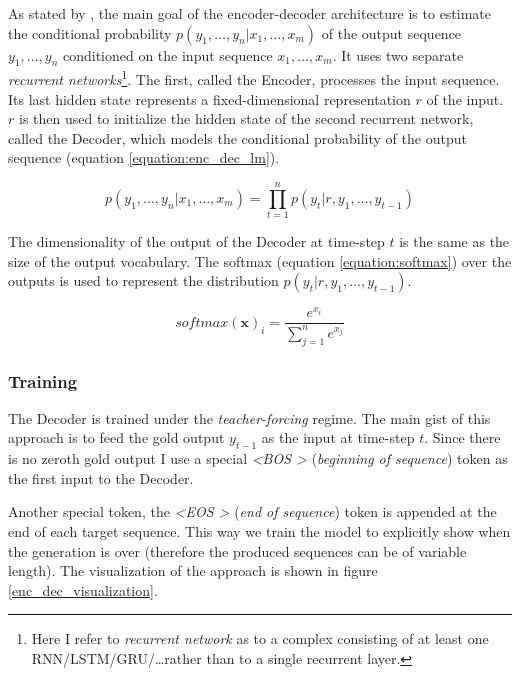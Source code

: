 As stated by \citep{sutskever2014sequence}, the main goal of the encoder-decoder architecture is to estimate the conditional probability $p(y_1,\dots,y_n | x_1,\dots,x_m)$ of the output sequence $y_1,\dots,y_n$ conditioned on the input sequence $x_1,\dots,x_m$. It uses two separate \emph{recurrent networks}\footnote{Here I refer to \emph{recurrent network} as to a complex consisting of at least one RNN/LSTM/GRU/\dots rather than to a single recurrent layer.}. The first, called the Encoder, processes the input sequence. Its last hidden state represents a fixed-dimensional representation $r$ of the input. $r$ is then used to initialize the hidden state of the second recurrent network, called the Decoder, which models the conditional probability of the output sequence (equation \ref{equation:enc_dec_lm}).

\begin{equation} \label{equation:enc_dec_lm}
    p(y_1,\dots, y_n | x_1,\dots, x_m) = \prod_{t=1}^n{p(y_t | r, y_1, \dots, y_{t-1})}
\end{equation}

The dimensionality of the output of the Decoder at time-step $t$ is the same as the size of the output vocabulary. The softmax (equation \ref{equation:softmax}) over the outputs is used to represent the distribution $p(y_t | r, y_1, \dots, y_{t-1})$.

\begin{equation} \label{equation:softmax}
    softmax(\boldsymbol{x})_i = \frac{e^{x_i}}{\sum_{j=1}^n{e^{x_j}}}
\end{equation}

\subsubsection{Training}

The Decoder is trained under the \emph{teacher-forcing} regime. The main gist of this approach is to feed the gold output $y_{t-1}$ as the input at time-step $t$. Since there is no zeroth gold output I use a special \emph{\textless BOS \textgreater} (\emph{beginning of sequence}) token as the first input to the Decoder.

Another special token, the \emph{\textless EOS \textgreater} (\emph{end of sequence}) token is appended at the end of each target sequence. This way we train the model to explicitly show when the generation is over (therefore the produced sequences can be of variable length). The visualization of the approach is shown in figure \ref{enc_dec_visualization}.


